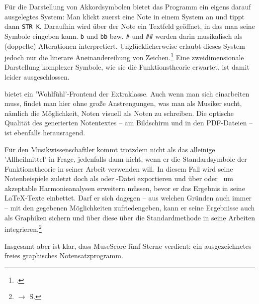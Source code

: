 Für die Darstellung von Akkordsymbolen bietet das Programm ein eigens darauf
ausgelegtes System: Man klickt zuerst eine Note in einem System an und tippt
dann \texttt{STR K}. Daraufhin wird über der Note ein Textfeld geöffnet, in das
man seine Symbole eingeben kann. \texttt{b} und \texttt{bb} bzw. \texttt{\#} und
\texttt{\#\#} werden darin musikalisch als (doppelte) Alterationen
interpretiert. Unglücklicherweise erlaubt dieses System jedoch nur die linerare
Aneinandereihung von Zeichen.\footcite[vgl.][\nopage wp.]{MuseScore2019i} Eine
zweidimensionale Darstellung komplexer Symbole, wie sie die Funktionstheorie
erwartet, ist damit leider ausgeschlossen.

 bietet ein 'Wohlfühl'-Frontend der Extraklasse. Auch wenn man
sich einarbeiten muss, findet man hier ohne große Anstrengungen, was man als
Musiker sucht, nämlich die Möglichkeit, Noten visuell als Noten zu schreiben.
Die optische Qualität des generierten Notentextes -- am Bildschirm und in den
PDF-Dateien -- ist ebenfalls herausragend. 

Für den Musikwissenschaftler kommt  trotzdem nicht als das
alleinige 'Allheilmittel' in Frage, jedenfalls dann nicht, wenn er die
Standardsymbole der Funktionstheorie in seiner Arbeit verwenden will. In diesem
Fall  wird seine Notenbeispiele zuletzt doch als  oder
-Datei exportieren und über  oder  \ um
akzeptable Harmonieanalysen erweitern müssen, bevor er das Ergebnis in seine
\LaTeX-Texte einbettet. Darf er sich dagegen -- aus welchen Gründen auch immer
-- mit den gegebenen Möglichkeiten zufriedengeben, kann er seine Ergebnisse auch
als Graphiken sichern und über diese über die Standardmethode in seine Arbeiten
integrieren.\footnote{$\rightarrow$ S. \pageref{IncludeGraphics}}

Insgesamt aber ist klar, dass MuseScore fünf Sterne verdient: ein
ausgezeichnetes freies graphisches Notensatzprogramm.
%
